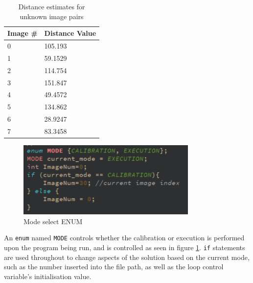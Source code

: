\documentclass[conference]{IEEEtran}
\begin{document}
\begin{table}[]
\caption{Distance estimates for unknown image pairs}
\label{tab:t4_guesses}
\begin{tabular}{|l|l|}
\hline
\multicolumn{1}{|l|}{\textbf{Image \#}} & \textbf{Distance Value} \\	\hline
0                                       & 105.193                 \\	\hline
1                                       & 59.1529                 \\	\hline
2                                       & 114.754                 \\	\hline
3                                       & 151.847                 \\	\hline
4                                       & 49.4572                 \\	\hline
5                                       & 134.862                 \\	\hline
6                                       & 28.9247                 \\	\hline
7                                       & 83.3458                 \\	\hline
\end{tabular}
\end{table}

\begin{figure}[H]
\centering
\includegraphics[width=3.5in]{t4_enum}
\caption{Mode select ENUM}
\label{fig:mode}
\end{figure}

An \verb|enum| named \verb|MODE| controls whether the calibration or execution is performed upon the program being run, and is controlled as seen in figure \ref{fig:mode}. \verb|if| statements are used throughout to change aspects of the solution based on the current mode, such as the number inserted into the file path, as well as the loop control variable's initialisation value.
\end{document}
